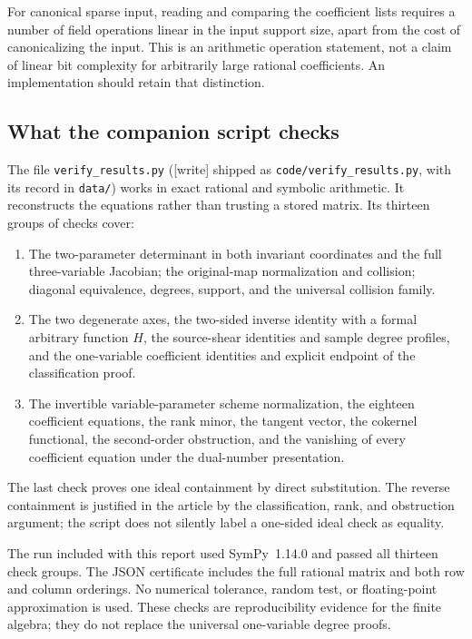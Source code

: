 \documentclass[11pt,a4paper]{article}
\numberwithin{equation}{section}
\theoremstyle{definition}
\theoremstyle{remark}
\newcommand{\wtag}{\textup{[write]}}%
\newcommand{\rpath}[1]{\nolinkurl{#1}}
\begin{document}
For canonical sparse input, reading and comparing the coefficient lists
requires a number of field operations linear in the input support size,
apart from the cost of canonicalizing the input. This is an arithmetic
operation statement, not a claim of linear bit complexity for arbitrarily
large rational coefficients. An implementation should retain that distinction.

\subsection{What the companion script checks}

The file \texttt{verify\_results.py} (\wtag{} shipped as
\rpath{code/verify_results.py}, with its record in \rpath{data/}) works in
exact rational and symbolic arithmetic. It reconstructs the equations rather than trusting a stored
matrix. Its thirteen groups of checks cover:
\begin{enumerate}[label=\arabic*.]
\item The two-parameter determinant in both invariant coordinates and the
full three-variable Jacobian; the original-map normalization and collision;
diagonal equivalence, degrees, support, and the universal collision family.
\item The two degenerate axes, the two-sided inverse identity with a formal
arbitrary function $H$, the source-shear identities and sample degree
profiles, and the one-variable coefficient identities and explicit endpoint
of the classification proof.
\item The invertible variable-parameter scheme normalization, the eighteen
coefficient equations, the rank minor, the tangent
vector, the cokernel functional, the second-order obstruction, and the
vanishing of every coefficient equation under the dual-number presentation.
\end{enumerate}
The last check proves one ideal containment by direct substitution. The
reverse containment is justified in the article by the classification,
rank, and obstruction argument; the script does not silently label a
one-sided ideal check as equality.

The run included with this report used SymPy~1.14.0 and passed all thirteen
check groups. The JSON certificate includes the full rational matrix and
both row and column orderings. No numerical tolerance, random test, or
floating-point approximation is used. These checks are reproducibility
evidence for the finite algebra; they do not replace the universal
one-variable degree proofs.
\end{document}
